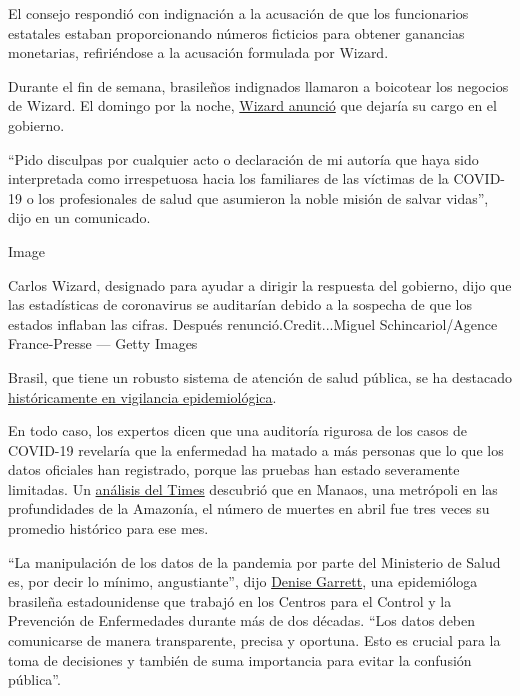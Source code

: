 El consejo respondió con indignación a la acusación de que los
funcionarios estatales estaban proporcionando números ficticios para
obtener ganancias monetarias, refiriéndose a la acusación formulada por
Wizard.

Durante el fin de semana, brasileños indignados llamaron a boicotear los
negocios de Wizard. El domingo por la noche,
\href{https://noticias.r7.com/saude/carlos-wizard-diz-que-nao-vai-mais-contribuir-com-ministerio-da-saude-07062020}{Wizard
anunció} que dejaría su cargo en el gobierno.

``Pido disculpas por cualquier acto o declaración de mi autoría que haya
sido interpretada como irrespetuosa hacia los familiares de las víctimas
de la COVID-19 o los profesionales de salud que asumieron la noble
misión de salvar vidas'', dijo en un comunicado.

Image

Carlos Wizard, designado para ayudar a dirigir la respuesta del
gobierno, dijo que las estadísticas de coronavirus se auditarían debido
a la sospecha de que los estados inflaban las cifras. Después
renunció.Credit...Miguel Schincariol/Agence France-Presse --- Getty
Images

Brasil, que tiene un robusto sistema de atención de salud pública, se ha
destacado
\href{https://www.nytimes3xbfgragh.onion/es/2020/05/18/espanol/america-latina/covid-brasil.html}{históricamente
en vigilancia epidemiológica}.

En todo caso, los expertos dicen que una auditoría rigurosa de los casos
de COVID-19 revelaría que la enfermedad ha matado a más personas que lo
que los datos oficiales han registrado, porque las pruebas han estado
severamente limitadas. Un
\href{https://www.nytimes3xbfgragh.onion/es/2020/05/12/espanol/america-latina/virus-latinoamerica.html}{análisis
del Times} descubrió que en Manaos, una metrópoli en las profundidades
de la Amazonía, el número de muertes en abril fue tres veces su promedio
histórico para ese mes.

``La manipulación de los datos de la pandemia por parte del Ministerio
de Salud es, por decir lo mínimo, angustiante'', dijo
\href{https://www.sabin.org/leadership\#DG}{Denise Garrett}, una
epidemióloga brasileña estadounidense que trabajó en los Centros para el
Control y la Prevención de Enfermedades durante más de dos décadas.
``Los datos deben comunicarse de manera transparente, precisa y
oportuna. Esto es crucial para la toma de decisiones y también de suma
importancia para evitar la confusión pública''.

